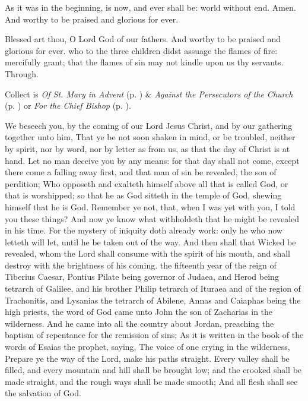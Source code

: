 As it was in the beginning, is now, and ever shall be: world without end. Amen. And worthy to be praised and glorious for ever.

Blessed art thou, O Lord God of our fathers. And worthy to be praised and glorious for ever.
\collect
{} who to the three children didst assuage the flames of fire: mercifully grant; that the flames of sin may not kindle upon us thy servants. Through.
\begin{rubric}
     Collect is \emph{Of St. Mary in Advent} (p. \pageref{SPMaryInAdvent}) \&  \emph{Against the Persecutors of the Church} (p. \pageref{SPAgainst}) or \emph{For the Chief Bishop} (p. \pageref{SPChiefBishop}).
\end{rubric}
 We beseech you, by the coming of our Lord Jesus Christ, and by our gathering together unto him, That ye be not soon shaken in mind, or be troubled, neither by spirit, nor by word, nor by letter as from us, as that the day of Christ is at hand. Let no man deceive you by any means: for that day shall not come, except there come a falling away first, and that man of sin be revealed, the son of perdition; Who opposeth and exalteth himself above all that is called God, or that is worshipped; so that he as God sitteth in the temple of God, shewing himself that he is God. Remember ye not, that, when I was yet with you, I told you these things? And now ye know what withholdeth that he might be revealed in his time. For the mystery of iniquity doth already work: only he who now letteth will let, until he be taken out of the way. And then shall that Wicked be revealed, whom the Lord shall consume with the spirit of his mouth, and shall destroy with the brightness of his coming.
 the fifteenth year of the reign of Tiberius Caesar, Pontius Pilate being governor of Judaea, and Herod being tetrarch of Galilee, and his brother Philip tetrarch of Ituraea and of the region of Trachonitis, and Lysanias the tetrarch of Abilene, Annas and Caiaphas being the high priests, the word of God came unto John the son of Zacharias in the wilderness. And he came into all the country about Jordan, preaching the baptism of repentance for the remission of sins; As it is written in the book of the words of Esaias the prophet, saying, The voice of one crying in the wilderness, Prepare ye the way of the Lord, make his paths straight. Every valley shall be filled, and every mountain and hill shall be brought low; and the crooked shall be made straight, and the rough ways shall be made smooth; And all flesh shall see the salvation of God.
